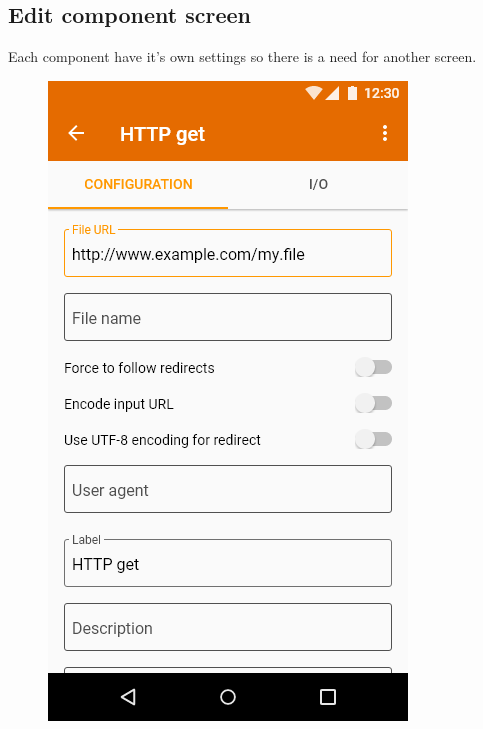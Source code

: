 \subsection{Edit component screen}
Each component have it's own settings so there is a need for another screen.

\begin{figure}\centering
    \begin{minipage}[b]{0.32\textwidth}
    	\includegraphics[width=\textwidth]{pics/xd/Edit component - configuration.png}

\end{minipage}
\end{figure}
